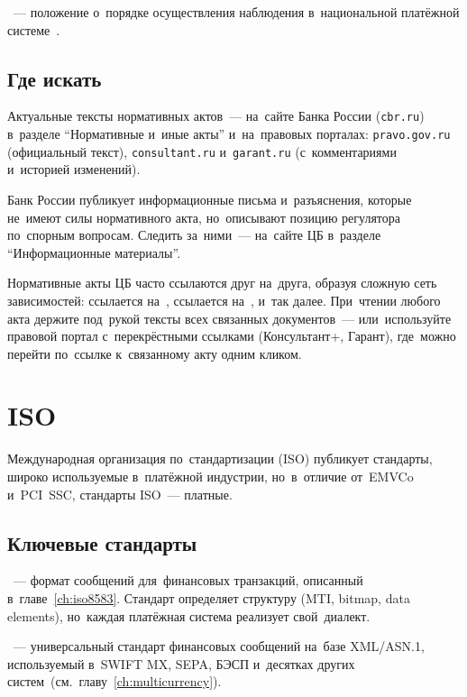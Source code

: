 \textbf{}~--- положение о~порядке осуществления
наблюдения в~национальной платёжной
системе~.

\subsection*{Где искать}

Актуальные тексты нормативных актов~--- на~сайте Банка России
(\texttt{cbr.ru}) в~разделе \enquote{Нормативные и~иные акты}
и~на~правовых порталах: \texttt{pravo.gov.ru} (официальный
текст), \texttt{consultant.ru} и~\texttt{garant.ru}
(с~комментариями и~историей изменений).

Банк России публикует информационные письма и~разъяснения,
которые не~имеют силы нормативного акта, но~описывают
позицию регулятора по~спорным вопросам. Следить за~ними~---
на~сайте ЦБ в~разделе \enquote{Информационные материалы}.

\begin{practice}
  Нормативные акты ЦБ часто ссылаются друг на~друга,
  образуя сложную сеть зависимостей:  ссылается
  на~,  ссылается на~,
  и~так далее. При~чтении любого акта держите под~рукой
  тексты всех связанных документов~--- или~используйте
  правовой портал с~перекрёстными ссылками (Консультант+,
  Гарант), где~можно перейти по~ссылке к~связанному акту
  одним кликом.
\end{practice}


\section{ISO}
\label{sec:ps-iso}

Международная организация по~стандартизации (ISO) публикует
стандарты, широко используемые в~платёжной индустрии,
но~в~отличие от~EMVCo и~PCI~SSC, стандарты ISO~---
платные.

\subsection*{Ключевые стандарты}

\textbf{}~--- формат сообщений для~финансовых
транзакций, описанный в~главе~\ref{ch:iso8583}. Стандарт
определяет структуру (MTI, bitmap, data elements), но~каждая
платёжная система реализует свой~диалект.

\textbf{}~--- универсальный стандарт финансовых
сообщений на~базе XML/ASN.1, используемый в~SWIFT MX,
SEPA, БЭСП и~десятках других
систем~(см.~главу~\ref{ch:multicurrency}).

